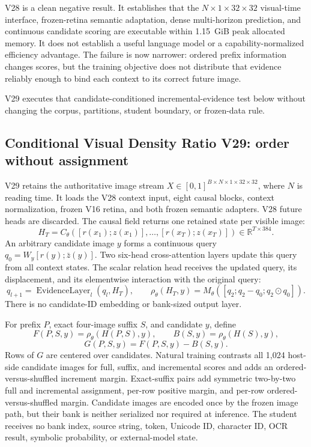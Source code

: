 \documentclass[11pt]{article}
\begin{document}
V28 is a clean negative result. It establishes that the
$N\times1\times32\times32$ visual-time interface, frozen-retina semantic
adaptation, dense multi-horizon prediction, and continuous candidate scoring
are executable within 1.15~GiB peak allocated memory. It does not establish a
useful language model or a capability-normalized efficiency advantage. The
failure is now narrower: ordered prefix information changes scores, but the
training objective does not distribute that evidence reliably enough to bind
each context to its correct future image.

V29 executes that candidate-conditioned incremental-evidence test below without
changing the corpus, partitions, student boundary, or frozen-data rule.

\subsection{Conditional Visual Density Ratio V29: order without assignment}

V29 retains the authoritative image stream
$X\in[0,1]^{B\times N\times1\times32\times32}$, where $N$ is reading time.
It loads the V28 context input, eight causal blocks, context normalization,
frozen V16 retina, and both frozen semantic adapters. V28 future heads are
discarded. The causal field returns one retained state per visible image:
\[
H_T=C_\theta([r(x_1);z(x_1)],\ldots,[r(x_T);z(x_T)])
\in\mathbb R^{T\times384}.
\]
An arbitrary candidate image $y$ forms a continuous query
$q_0=W_y[r(y);\bar z(y)]$. Two six-head cross-attention layers update this query
from all context states. The scalar relation head receives the updated query,
its displacement, and its elementwise interaction with the original query:
\[
q_{l+1}=\operatorname{EvidenceLayer}_l(q_l,H_T),\qquad
\rho_\theta(H_T,y)=M_\theta([q_2;q_2-q_0;q_2\odot q_0]).
\]
There is no candidate-ID embedding or bank-sized output layer.

For prefix $P$, exact four-image suffix $S$, and candidate $y$, define
\[
F(P,S,y)=\rho_\theta(H(P,S),y),\qquad
B(S,y)=\rho_\theta(H(S),y),
\]
\[
G(P,S,y)=F(P,S,y)-B(S,y).
\]
Rows of $G$ are centered over candidates. Natural training contrasts all 1,024
host-side candidate images for full, suffix, and incremental scores and adds an
ordered-versus-shuffled increment margin. Exact-suffix pairs add symmetric
two-by-two full and incremental assignment, per-row positive margin, and
per-row ordered-versus-shuffled margin. Candidate images are encoded once by
the frozen image path, but their bank is neither serialized nor required at
inference. The student receives no bank index, source string, token, Unicode
ID, character ID, OCR result, symbolic probability, or external-model state.
\end{document}
